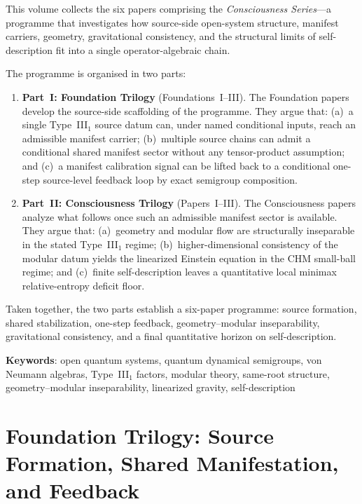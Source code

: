 \documentclass[12pt,a4paper,openany]{book}
\begin{document}
This volume collects the six papers comprising the
\emph{Consciousness Series}---a programme that investigates how
source-side open-system structure, manifest carriers, geometry,
gravitational consistency, and the structural limits of self-description
fit into a single operator-algebraic chain.

The programme is organised in two parts:

\begin{enumerate}
\item \textbf{Part~I: Foundation Trilogy} (Foundations~I--III).
  The Foundation papers develop the source-side scaffolding of the
  programme. They argue that:
  (a)~a single Type~III$_1$ source datum can, under named conditional
  inputs, reach an admissible manifest carrier;
  (b)~multiple source chains can admit a conditional shared manifest
  sector without any tensor-product assumption; and
  (c)~a manifest calibration signal can be lifted back to a conditional
  one-step source-level feedback loop by exact semigroup composition.

\item \textbf{Part~II: Consciousness Trilogy} (Papers~I--III).
  The Consciousness papers analyze what follows once such an admissible
  manifest sector is available. They argue that:
  (a)~geometry and modular flow are structurally inseparable in the
  stated Type~III$_1$ regime;
  (b)~higher-dimensional consistency of the modular datum yields the
  linearized Einstein equation in the CHM small-ball regime; and
  (c)~finite self-description leaves a quantitative local minimax
  relative-entropy deficit floor.
\end{enumerate}

Taken together, the two parts establish a six-paper programme: source
formation, shared stabilization, one-step feedback, geometry--modular
inseparability, gravitational consistency, and a final quantitative
horizon on self-description.

\bigskip
\noindent\textbf{Keywords}: open quantum systems, quantum dynamical
semigroups, von Neumann algebras, Type~III$_1$ factors, modular theory,
same-root structure, geometry--modular inseparability, linearized
gravity, self-description

\tableofcontents

\mainmatter

\part{Foundation Trilogy: Source Formation, Shared Manifestation, and Feedback}
\end{document}
